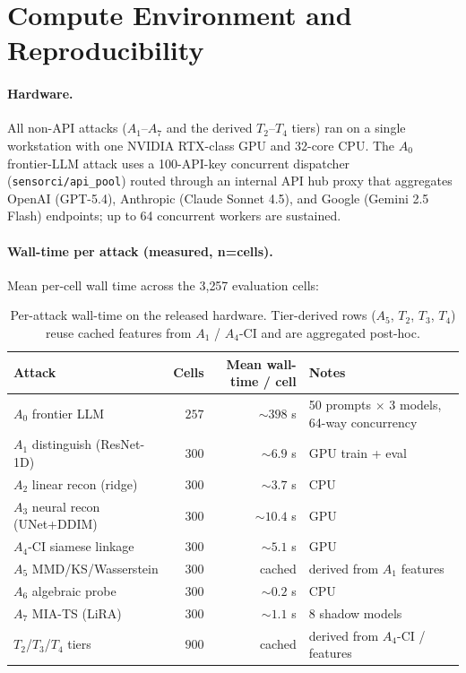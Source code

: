 \documentclass{article}
\theoremstyle{remark}
\begin{document}
\section{Compute Environment and Reproducibility}
\label{app:compute}

\paragraph{Hardware.} All non-API attacks ($A_1$--$A_7$ and the derived $T_2$--$T_4$ tiers) ran on a single workstation with one NVIDIA RTX-class GPU and 32-core CPU. The $A_0$ frontier-LLM attack uses a 100-API-key concurrent dispatcher (\texttt{sensorci/api\_pool}) routed through an internal API hub proxy that aggregates OpenAI (GPT-5.4), Anthropic (Claude Sonnet 4.5), and Google (Gemini 2.5 Flash) endpoints; up to 64 concurrent workers are sustained.

\paragraph{Wall-time per attack (measured, n=cells).} Mean per-cell wall time across the 3{,}257 evaluation cells:

\begin{table}[h]
\centering
\caption{Per-attack wall-time on the released hardware. Tier-derived rows ($A_5$, $T_2$, $T_3$, $T_4$) reuse cached features from $A_1$ / $A_4$-CI and are aggregated post-hoc.}
\label{tab:walltime}
\small
\begin{tabular}{@{}lrrl@{}}
\toprule
Attack & Cells & Mean wall-time / cell & Notes \\
\midrule
$A_0$ frontier LLM & $257$ & $\sim$$398$ s & 50 prompts $\times$ 3 models, 64-way concurrency \\
$A_1$ distinguish (ResNet-1D) & $300$ & $\sim$$6.9$ s & GPU train + eval \\
$A_2$ linear recon (ridge) & $300$ & $\sim$$3.7$ s & CPU \\
$A_3$ neural recon (UNet+DDIM) & $300$ & $\sim$$10.4$ s & GPU \\
$A_4$-CI siamese linkage & $300$ & $\sim$$5.1$ s & GPU \\
$A_5$ MMD/KS/Wasserstein & $300$ & cached & derived from $A_1$ features \\
$A_6$ algebraic probe & $300$ & $\sim$$0.2$ s & CPU \\
$A_7$ MIA-TS (LiRA) & $300$ & $\sim$$1.1$ s & 8 shadow models \\
$T_2$/$T_3$/$T_4$ tiers & $900$ & cached & derived from $A_4$-CI / features \\
\bottomrule
\end{tabular}
\end{table}
\end{document}
